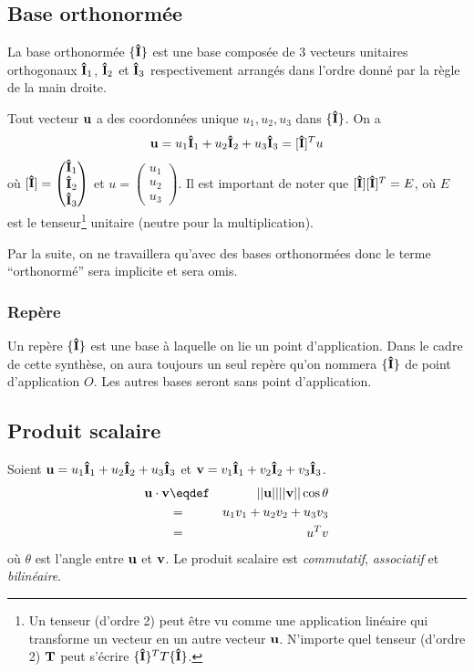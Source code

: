 \subsection{Base orthonormée}
La base orthonormée $\{{\bf\hat{I}}\}$ est une base composée de 3 vecteurs unitaires orthogonaux ${\bf\hat{I}}_1$, ${\bf\hat{I}}_2$ et ${\bf\hat{I}}_3$ respectivement arrangés dans l'ordre donné par la règle de la main droite.

Tout vecteur ${\bf u}$ a des coordonnées unique $u_1, u_2, u_3$ dans $\{{\bf\hat{I}}\}$.
On a
$$ {\bf u} = u_1{\bf\hat{I}}_1 + u_2{\bf\hat{I}}_2 + u_3{\bf\hat{I}}_3 = [{\bf\hat{I}}]^T u$$
où $[{\bf\hat{I}}] =
\begin{pmatrix}
  {\bf\hat{I}}_1\\{\bf\hat{I}}_2\\{\bf\hat{I}}_3
\end{pmatrix}$ et $u =
\begin{pmatrix}
  u_1 \\ u_2 \\ u_3
\end{pmatrix}$.
Il est important de noter que $[{\bf\hat{I}}][{\bf\hat{I}}]^T = E$, où $E$ est le tenseur\footnote{Un tenseur
(d'ordre 2) peut être vu comme une application linéaire qui transforme un vecteur  en
un autre vecteur ${\bf u}$. N'importe quel tenseur (d'ordre 2) $\bf{T}$ peut s'écrire $ \{{\bf\hat{I}}\}^TT\{{\bf\hat{I}}\}$.} 
unitaire (neutre pour la multiplication).

Par la suite, on ne travaillera qu'avec des bases orthonormées donc le terme ``orthonormé'' sera implicite et sera omis.

\subsubsection{Repère}
Un repère $\{{\bf\hat{I}}\}$ est une base à laquelle on lie un point d'application.
Dans le cadre de cette synthèse, on aura toujours un seul repère qu'on nommera $\{{\bf\hat{I}}\}$ de point d'application $O$.
Les autres bases seront sans point d'application.

\subsection{Produit scalaire}
Soient ${\bf u} = u_1{\bf\hat{I}}_1 + u_2{\bf\hat{I}}_2 + u_3{\bf\hat{I}}_3$ et ${\bf v} = v_1{\bf\hat{I}}_1 + v_2{\bf\hat{I}}_2 + v_3{\bf\hat{I}}_3$.
\begin{eqnarray*}
  \fv{u}\cdot\fv{v} & \eqdef & ||\fv{u}|| ||\fv{v}|| \cos\theta\\
                    & = & u_1v_1 + u_2v_2 + u_3v_3\\
                    & = & u^T v
\end{eqnarray*}
où $\theta$ est l'angle entre ${\bf u}$ et ${\bf v}$.
Le produit scalaire est {\em commutatif}, {\em associatif} et {\em bilinéaire}.

